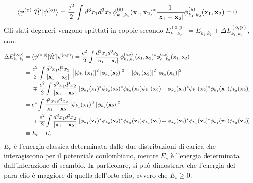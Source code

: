\begin{example}
	\begin{equation*}
		\braket{\psi^{(\mathrm{p})} | \hat{\mathcal{H}}' | \psi^{(\mathrm{o})}} = \frac{e^2}{2} \int d^3 x_1 d^3 x_2 \, \phi^{(\mathrm{s})}_{k_1, k_2}(\mathbf{x}_1, \mathbf{x}_2)^* \frac{1}{\left\lvert\mathbf{x}_1 - \mathbf{x}_2\right\rvert} \phi^{(\mathrm{a})}_{k_1, k_2}(\mathbf{x}_1, \mathbf{x}_2) = 0
	\end{equation*}
	Gli stati degeneri vengono splittati in coppie secondo $ E_{k_1, k_2}^{(\mathrm{o},\mathrm{p})} = E_{k_1, k_2} + \Delta E_{k_1, k_2}^{(\mathrm{o},\mathrm{p})} $, con:
	\begin{equation*}
		\begin{split}
			\Delta E_{k_1, k_2}^{(\mathrm{o},\mathrm{p})}
			&=  \braket{\psi^{(\mathrm{o},\mathrm{p})} | \hat{\mathcal{H}}' | \psi^{(\mathrm{o},\mathrm{p})}} = \frac{e^2}{2} \int \frac{d^3 x_1 d^3 x_2}{\left\lvert\mathbf{x}_1 - \mathbf{x}_2\right\rvert} \, \phi^{(\mathrm{a},\mathrm{s})}_{k_1, k_2}(\mathbf{x}_1, \mathbf{x}_2)^* \phi^{(\mathrm{a},\mathrm{s})}_{k_1, k_2}(\mathbf{x}_1, \mathbf{x}_2) \\
			&= \frac{e^2}{2} \int \frac{d^3 x_1 d^3 x_2}{\left\lvert\mathbf{x}_1 - \mathbf{x}_2\right\rvert} \, \left[ \left\lvert\phi_{k_1}(\mathbf{x}_1)\right\rvert^2 \left\lvert\phi_{k_2}(\mathbf{x}_2)\right\rvert^2 + \left\lvert\phi_{k_1}(\mathbf{x}_2)\right\rvert^2 \left\lvert\phi_{k_2}(\mathbf{x}_1)\right\rvert^2 \right] \\
			&\quad\,\, \mp \frac{e^2}{2} \int \frac{d^3 x_1 d^3 x_2}{\left\lvert\mathbf{x}_1 - \mathbf{x}_2\right\rvert} \, \left[ \phi_{k_1}(\mathbf{x}_1)^* \phi_{k_2}(\mathbf{x}_2)^* \phi_{k_2}(\mathbf{x}_1) \phi_{k_1}(\mathbf{x}_2) + \phi_{k_2}(\mathbf{x}_1)^* \phi_{k_1}(\mathbf{x}_2)^* \phi_{k_1}(\mathbf{x}_1) \phi_{k_2}(\mathbf{x}_2) \right]\\
			&= e^2 \int \frac{d^3 x_1 d^3 x_2}{\left\lvert\mathbf{x}_1 - \mathbf{x}_2\right\rvert} \, \left\lvert\phi_{k_1}(\mathbf{x}_1)\right\rvert^2 \left\lvert\phi_{k_2}(\mathbf{x}_2)\right\rvert^2 \\
			&\quad\,\, \mp \frac{e^2}{2} \int \frac{d^3 x_1 d^3 x_2}{\left\lvert\mathbf{x}_1 - \mathbf{x}_2\right\rvert} \, \left[ \phi_{k_1}(\mathbf{x}_1)^* \phi_{k_2}(\mathbf{x}_2)^* \phi_{k_2}(\mathbf{x}_1) \phi_{k_1}(\mathbf{x}_2) + \phi_{k_2}(\mathbf{x}_1)^* \phi_{k_1}(\mathbf{x}_2)^* \phi_{k_1}(\mathbf{x}_1) \phi_{k_2}(\mathbf{x}_2) \right]\\
			&\equiv E_c \mp E_s
		\end{split}
	\end{equation*}
	$ E_c $ è l'energia classica determinata dalle due distribuzioni di carica che interagiscono per il potenziale coulombiano, mentre $ E_s $ è l'energia determinata dall'interazione di scambio. In particolare, si può dimostrare che l'energia del para-elio è maggiore di quella dell'orto-elio, ovvero che $ E_s \ge 0 $.
\end{example}

